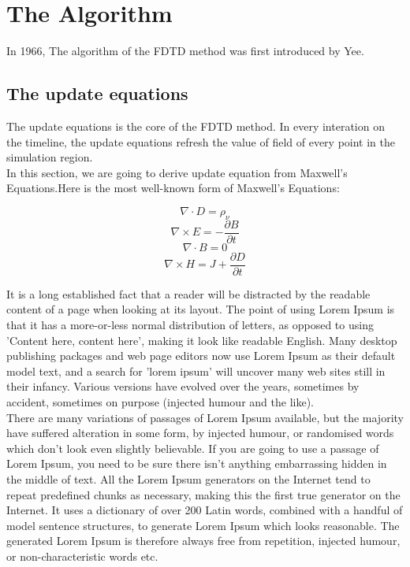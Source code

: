\section{The Algorithm}

In 1966, The algorithm of the FDTD method was first introduced by Yee.

\subsection{The update equations}

The update equations is the core of the FDTD method. In every interation on the timeline, the update equations refresh
the value of field of every point in the simulation region.\\

In this section, we are going to derive update equation from Maxwell's Equations.Here is the most well-known form of
Maxwell's Equations:

\begin{displaymath}
  \nabla \cdot D = \rho_{\nu}
\end{displaymath}
\begin{displaymath}
    \nabla \times E = -\frac{\partial B}{\partial t}
\end{displaymath}
\begin{displaymath}
  \nabla \cdot B = 0
\end{displaymath}
\begin{displaymath}
  \nabla \times H = J + \frac{\partial D}{\partial t}
\end{displaymath}

It is a long established fact that a reader will be distracted by the readable content of a page when looking at its
layout. The point of using Lorem Ipsum is that it has a more-or-less normal distribution of letters, as opposed to using
'Content here, content here', making it look like readable English. Many desktop publishing packages and web page
editors now use Lorem Ipsum as their default model text, and a search for 'lorem ipsum' will uncover many web sites
still in their infancy. Various versions have evolved over the years, sometimes by accident, sometimes on purpose
(injected humour and the like).\\

There are many variations of passages of Lorem Ipsum available, but the majority have suffered alteration in some form,
by injected humour, or randomised words which don't look even slightly believable. If you are going to use a passage of
Lorem Ipsum, you need to be sure there isn't anything embarrassing hidden in the middle of text. All the Lorem Ipsum
generators on the Internet tend to repeat predefined chunks as necessary, making this the first true generator on the
Internet. It uses a dictionary of over 200 Latin words, combined with a handful of model sentence structures, to
generate Lorem Ipsum which looks reasonable. The generated Lorem Ipsum is therefore always free from repetition,
injected humour, or non-characteristic words etc.\\




